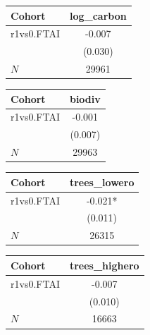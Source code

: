 {
\def\sym#1{\ifmmode^{#1}\else\(^{#1}\)\fi}
\begin{tabular}{l*{1}{c}}
\toprule
Cohort    &log\_carbon   \\
\midrule
r1vs0.FTAI&   -0.007   \\
          &  (0.030)   \\
\midrule
\(N\)     &    29961   \\
\bottomrule
\end{tabular}
}
{
\def\sym#1{\ifmmode^{#1}\else\(^{#1}\)\fi}
\begin{tabular}{l*{1}{c}}
\toprule
Cohort    &   biodiv   \\
\midrule
r1vs0.FTAI&   -0.001   \\
          &  (0.007)   \\
\midrule
\(N\)     &    29963   \\
\bottomrule
\end{tabular}
}
{
\def\sym#1{\ifmmode^{#1}\else\(^{#1}\)\fi}
\begin{tabular}{l*{1}{c}}
\toprule
Cohort    &trees\_lowero   \\
\midrule
r1vs0.FTAI&   -0.021*  \\
          &  (0.011)   \\
\midrule
\(N\)     &    26315   \\
\bottomrule
\end{tabular}
}
{
\def\sym#1{\ifmmode^{#1}\else\(^{#1}\)\fi}
\begin{tabular}{l*{1}{c}}
\toprule
Cohort    &trees\_highero   \\
\midrule
r1vs0.FTAI&   -0.007   \\
          &  (0.010)   \\
\midrule
\(N\)     &    16663   \\
\bottomrule
\end{tabular}
}
